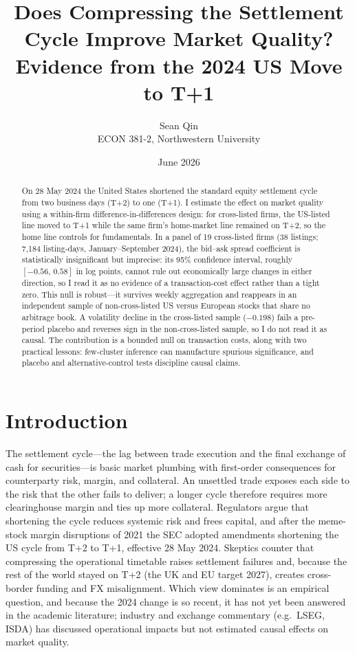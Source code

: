 \documentclass[11pt]{article}
\title{Does Compressing the Settlement Cycle Improve Market Quality?\\
\large Evidence from the 2024 US Move to T+1}
\author{Sean Qin \\ \small ECON 381-2, Northwestern University}
\date{June 2026}
\begin{document}
\maketitle

\begin{abstract}
\noindent On 28 May 2024 the United States shortened the standard equity settlement
cycle from two business days (T+2) to one (T+1). I estimate the effect on market
quality using a within-firm difference-in-differences design: for cross-listed
firms, the US-listed line moved to T+1 while the same firm's home-market line
remained on T+2, so the home line controls for fundamentals. In a panel of 19
cross-listed firms (38 listings; 7{,}184 listing-days, January--September 2024),
the bid--ask spread coefficient is statistically insignificant but imprecise: its 95\% confidence interval, roughly $[-0.56,\,0.58]$ in log points,
cannot rule out economically large changes in either direction, so I read it as no evidence of a transaction-cost effect rather than a tight zero. This
null is robust---it survives weekly aggregation and reappears in an independent
sample of non-cross-listed US versus European stocks that share no arbitrage book.
A volatility decline in the cross-listed sample ($-0.198$) fails a pre-period placebo and reverses sign in the non-cross-listed
sample, so I do not read it as causal. The contribution is a bounded null on transaction costs, along with two practical lessons: few-cluster inference can manufacture spurious significance, and placebo and alternative-control tests discipline causal claims.
\end{abstract}

\section{Introduction}
The settlement cycle---the lag between trade execution and the final exchange of
cash for securities---is basic market plumbing with first-order consequences for
counterparty risk, margin, and collateral. An unsettled trade exposes each side to
the risk that the other fails to deliver; a longer cycle therefore requires more
clearinghouse margin and ties up more collateral. Regulators argue that shortening
the cycle reduces systemic risk and frees capital, and after the meme-stock margin
disruptions of 2021 the SEC adopted amendments shortening the US cycle from T+2 to
T+1, effective 28 May 2024. Skeptics counter that compressing the operational
timetable raises settlement failures and, because the rest of the world stayed on
T+2 (the UK and EU target 2027), creates cross-border funding and FX misalignment.
Which view dominates is an empirical question, and because the 2024 change is so
recent, it has not yet been answered in the academic literature; industry and
exchange commentary (e.g.\ LSEG, ISDA) has discussed operational impacts but not
estimated causal effects on market quality.
\end{document}
